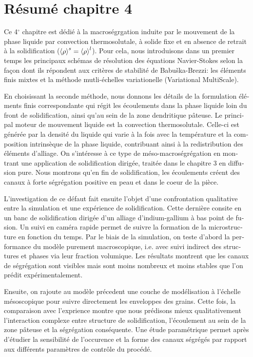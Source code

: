 \clearpage
\section*{Résumé chapitre 4}

\begin{otherlanguage}{french}
{\small

Ce 4$^\circ$ chapitre est dédié à la macroségrgation induite par le mouvement de la phase liquide par convection thermosolutale,
à solide fixe et en absence de retrait à la solidification ($\left \langle \rho \right \rangle^s=\left \langle \rho \right \rangle^l$).
Pour cela, nous introduisons dans un premier temps les principaux schémas de résolution des équations Navier-Stokes selon la façon
dont ils répondent aux critères de stabilité de Babuška-Brezzi: les éléments finis
mixtes et la méthode mutli-échelles variationelle (Variational MultiScale). 

En choisissant la seconde méthode, nous donnons les détails de la formulation éléments finis correspondante qui régit les écoulements dans la phase liquide
loin du front de solidification, ainsi qu'au sein de la zone dendritique pâteuse. Le principal moteur de mouvement liquide est la convection thermosolutale.
Celle-ci est générée par la densité du liquide qui varie à la fois avec la température et la composition intrinsèque de la phase liquide, contribuant ainsi 
à la redistribution des éléments d'alliage.  
On s'intéresse à ce type de méso-macroségrégation en montrant une application de solidification dirigée, traitée dans le chapitre 3 en diffusion pure. 
Nous montrons qu'en fin de solidification, les écoulements créent des canaux à forte ségrégation positive en peau et dans le coeur de la pièce. 

L'investigation de ce défaut fait ensuite l'objet d'une confrontation qualitative entre la simulation et une expérience de solidification. Cette dernière consite en un 
banc de solidification dirigée d'un alliage d'indium-gallium à bas point de fusion. Un suivi en caméra rapide permet de suivre la formation de la microstructure
en fonction du temps. Par le biais de la simulation, on teste d'abord la performance du modèle purement macroscopique, i.e. avec suivi indirect 
des structures et phases via leur fraction volumique. Les résultats montrent que les canaux de ségrégation sont visibles mais sont moins nombreux et moins
stables que l'on prédit expérimentalement. 

Ensuite, on rajoute au modèle précedent une couche de modélisation à l'échelle mésoscopique pour suivre directement
les enveloppes des grains. Cette fois, la comparaison avec l'exprience montre que nous prédisons mieux qualitativement l'interaction complexe entre 
structure de solidification, l'écoulement au sein de la zone pâteuse et la ségrégation conséquente. Une étude paramétrique permet après d'étudier la sensibilité
de l'occurence et la forme des canaux ségrégés par rapport aux différents paramètres de contrôle du procédé.

}
\end{otherlanguage}